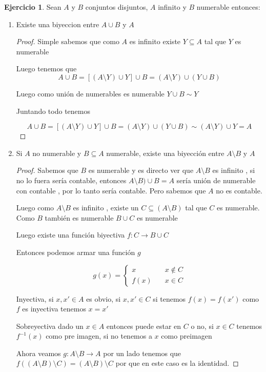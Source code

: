 \documentclass[12pt]{article}
\newcommand{\ra}{\rightarrow}
\theoremstyle{definition}
\newtheorem{ej}{Ejercicio}
\begin{document}
\begin{ej}
 Sean $A$ y $B$ conjuntos disjuntos, $A$ infinito y $B$ numerable entonces:
\begin{enumerate}
  \item Existe una biyeccion entre $A \cup B$ y $A$
    \begin{proof} 
    Simple sabemos que como $A$ es infinito existe $Y \subseteq A$ tal que $Y$ es numerable

    Luego tenemos que $$A \cup B = [(A \setminus Y ) \cup Y ] \cup B = (A \setminus Y) \cup (Y \cup B)$$

    Luego como unión de numerables es numerable $Y \cup B \sim Y$

    Juntando todo tenemos

  $$A \cup B = [(A \setminus Y ) \cup Y ] \cup B = (A \setminus Y) \cup (Y \cup B) \sim (A \setminus Y) \cup Y = A$$
\end{proof}

  \item Si $A$ no numerable y $B \subseteq A$ numerable, existe una biyección entre $A \setminus B$ y $A$
    \begin{proof} 
	    Sabemos que $B$ es numerable y es directo ver que $A\setminus B$ es infinito , si no lo fuera sería contable, entonces $A \setminus B ) \cup B = A$ sería unión de numerable con contable , por lo tanto sería contable. Pero sabemos que $A$ no es contable.

	    Luego como $A \setminus B$ es infinito , existe un $C \subseteq (A \setminus B)$ tal que $C$ es numerable. Como $B$ también es numerable $B \cup C$ es numerable

	    Luego existe una función biyectiva $f: C \ra B \cup C$

	    Entonces podemos armar una función $g$

   $$
    g(x) = \left\{
        \begin{array}{ll}
	  x  & \quad x  \notin C \\
	  f(x)  & \quad x \in C 
        \end{array}
    \right.
    $$

    Inyectiva, si $x ,x'\in A$ es obvio, si $x, x'\in C$ si tenemos $f(x) = f(x') $ como $f$ es inyectiva tenemos $x = x'$

    Sobreyectiva dado un $x \in A$ entonces puede estar en $C$ o no, si $x \in C$ tenemos $f^{-1}(x)$ como pre imagen, si no tenemos a $x$ como preimagen

    Ahora veamos $g: A \setminus B \ra A$ por un lado tenemos que $f((A\setminus B) \setminus C) = (A \setminus B )\setminus C$ por que en este caso es la identidad.


\end{proof}
\end{enumerate}
\end{ej}
\end{document}
